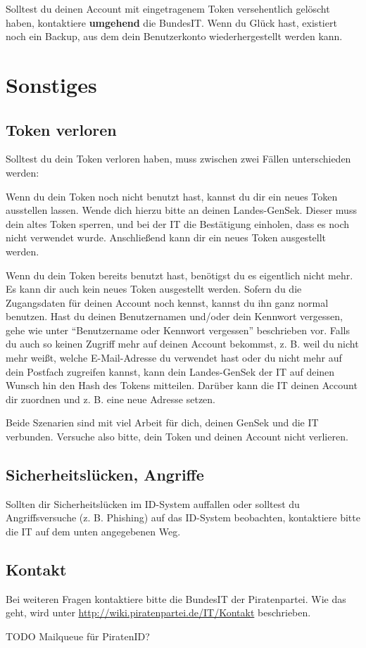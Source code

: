 \documentclass[parskip=half]{scrartcl}
\begin{document}
Solltest du deinen Account mit eingetragenem Token versehentlich gelöscht haben, kontaktiere \textbf{umgehend} die BundesIT.
Wenn du Glück hast, existiert noch ein Backup, aus dem dein Benutzerkonto wiederhergestellt werden kann.

\newpage
\section{Sonstiges}
\subsection{Token verloren}
Solltest du dein Token verloren haben, muss zwischen zwei Fällen unterschieden werden:

Wenn du dein Token noch nicht benutzt hast, kannst du dir ein neues Token ausstellen lassen.
Wende dich hierzu bitte an deinen Landes-GenSek. Dieser muss dein altes Token sperren,
und bei der IT die Bestätigung einholen, dass es noch nicht verwendet wurde.
Anschließend kann dir ein neues Token ausgestellt werden.

Wenn du dein Token bereits benutzt hast, benötigst du es eigentlich nicht mehr.
Es kann dir auch kein neues Token ausgestellt werden.
Sofern du die Zugangsdaten für deinen Account noch kennst, kannst du ihn ganz normal benutzen.
Hast du deinen Benutzernamen und/oder dein Kennwort vergessen, gehe wie unter "`Benutzername oder Kennwort vergessen"' beschrieben vor.
Falls du auch so keinen Zugriff mehr auf deinen Account bekommst,
z. B. weil du nicht mehr weißt, welche E-Mail-Adresse du verwendet hast oder du nicht mehr auf dein Postfach zugreifen kannst,
kann dein Landes-GenSek der IT auf deinen Wunsch hin den Hash des Tokens mitteilen.
Darüber kann die IT deinen Account dir zuordnen und z. B. eine neue Adresse setzen.

Beide Szenarien sind mit viel Arbeit für dich, deinen GenSek und die IT verbunden.
Versuche also bitte, dein Token und deinen Account nicht verlieren.

\subsection{Sicherheitslücken, Angriffe}
Sollten dir Sicherheitslücken im ID-System auffallen oder solltest du Angriffsversuche (z. B. Phishing) auf das ID-System beobachten,
kontaktiere bitte die IT auf dem unten angegebenen Weg.

\subsection{Kontakt}
Bei weiteren Fragen kontaktiere bitte die BundesIT der Piratenpartei.
Wie das geht, wird unter \url{http://wiki.piratenpartei.de/IT/Kontakt} beschrieben.

TODO Mailqueue für PiratenID?
\end{document}
